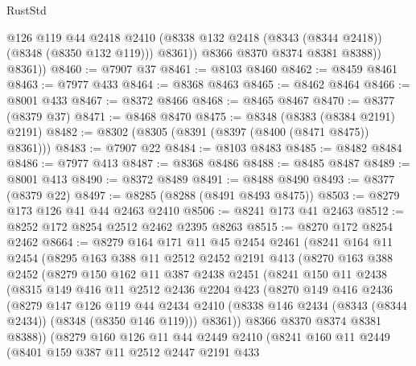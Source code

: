 \begin{lexlean}{RustStd}
\begin{coremodule}
{\begin{coremodule}
{{{{{{{{{{{{{{{{{{{{{{{{{{{{{{{{{{{{{{{{{{{{{{{{{{                @126
                @119
                @44
                @2418
                @2410
                (@8338 @132 @2418 (@8343 (@8344 @2418)) (@8348 (@8350 @132 @119)))
                @8361))
            @8366
            @8370
            @8374
            @8381
            @8388))
        @8361))
@8460 := @7907 @37
@8461 := @8103 @8460
@8462 := @8459 @8461
@8463 := @7977 @433
@8464 := @8368 @8463
@8465 := @8462 @8464
@8466 := @8001 @433
@8467 := @8372 @8466
@8468 := @8465 @8467
@8470 := @8377 (@8379 @37)
@8471 := @8468 @8470
@8475 := @8348 (@8383 (@8384 @2191) @2191)
@8482 := @8302 (@8305 (@8391 (@8397 (@8400 (@8471 @8475)) @8361)))
@8483 := @7907 @22
@8484 := @8103 @8483
@8485 := @8482 @8484
@8486 := @7977 @413
@8487 := @8368 @8486
@8488 := @8485 @8487
@8489 := @8001 @413
@8490 := @8372 @8489
@8491 := @8488 @8490
@8493 := @8377 (@8379 @22)
@8497 := @8285 (@8288 (@8491 @8493 @8475))
@8503 := @8279 @173 @126 @41 @44 @2463 @2410
@8506 := @8241 @173 @41 @2463
@8512 := @8252 @172 @8254 @2512 @2462 @2395 @8263
@8515 := @8270 @172 @8254 @2462
@8664 := @8279
    @164
    @171
    @11
    @45
    @2454
    @2461
    (@8241
      @164
      @11
      @2454
      (@8295
        @163
        @388
        @11
        @2512
        @2452
        @2191
        @413
        (@8270
          @163
          @388
          @2452
          (@8279
            @150
            @162
            @11
            @387
            @2438
            @2451
            (@8241
              @150
              @11
              @2438
              (@8315
                @149
                @416
                @11
                @2512
                @2436
                @2204
                @423
                (@8270
                  @149
                  @416
                  @2436
                  (@8279
                    @147
                    @126
                    @119
                    @44
                    @2434
                    @2410
                    (@8338 @146 @2434 (@8343 (@8344 @2434)) (@8348 (@8350 @146 @119)))
                    @8361))
                @8366
                @8370
                @8374
                @8381
                @8388))
            (@8279
              @160
              @126
              @11
              @44
              @2449
              @2410
              (@8241
                @160
                @11
                @2449
                (@8401
                  @159
                  @387
                  @11
                  @2512
                  @2447
                  @2191
                  @433
}}}}}}}}}}}}}}}}}}}}}}}}}}}}}}}}}}}}}}}}}}}}}}}}}}
\end{coremodule}}
\end{coremodule}
\end{lexlean}
